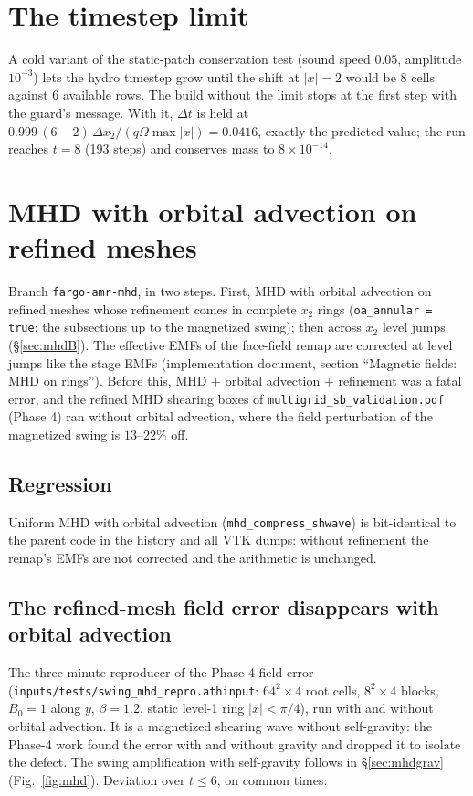 \documentclass[11pt]{article}
\newcommand{\code}[1]{\texttt{#1}}
\newcommand{\file}[1]{\texttt{\small #1}}
\newcommand{\Om}{\Omega}
\begin{document}
\section{The timestep limit}
\label{sec:dtlimit}
A cold variant of the static-patch conservation test (sound speed $0.05$, amplitude
$10^{-3}$) lets the hydro timestep grow until the shift at $|x| = 2$ would be 8 cells
against 6 available rows. The build without the limit stops at the first step with the
guard's message. With it, $\Delta t$ is held at
$0.999\,(6-2)\,\Delta x_2/(q\Om\max|x|) = 0.0416$, exactly the predicted value; the run
reaches $t = 8$ (193 steps) and conserves mass to $8\times10^{-14}$.

\section{MHD with orbital advection on refined meshes}
\label{sec:mhd}
Branch \code{fargo-amr-mhd}, in two steps. First, MHD with orbital advection on refined
meshes whose refinement comes in complete $x_2$ rings (\code{oa\_annular = true}; the
subsections up to the magnetized swing); then across $x_2$ level jumps
(\S\ref{sec:mhdB}). The effective EMFs of
the face-field remap are corrected at level jumps like the stage EMFs (implementation
document, section ``Magnetic fields: MHD on rings''). Before this, MHD $+$ orbital advection $+$ refinement was a
fatal error, and the refined MHD shearing boxes of \file{multigrid\_sb\_validation.pdf}
(Phase 4) ran without orbital advection, where the field perturbation of the magnetized
swing is $13$--$22\%$ off.

\subsection{Regression}
Uniform MHD with orbital advection (\file{mhd\_compress\_shwave}) is bit-identical to the
parent code in the history and all VTK dumps: without refinement the remap's EMFs are not
corrected and the arithmetic is unchanged.

\subsection{The refined-mesh field error disappears with orbital advection}
The three-minute reproducer of the Phase-4 field error
(\file{inputs/tests/swing\_mhd\_repro.athinput}: $64^2\times4$ root cells, $8^2\times4$
blocks, $B_0 = 1$ along $y$, $\beta = 1.2$, static level-1 ring $|x| < \pi/4$), run with
and without orbital advection. It is a magnetized shearing wave without self-gravity: the
Phase-4 work found the error with and without gravity and dropped it to isolate the
defect. The swing amplification with self-gravity follows in \S\ref{sec:mhdgrav}
(Fig.~\ref{fig:mhd}). Deviation over $t \le 6$, on common
times:
\end{document}
